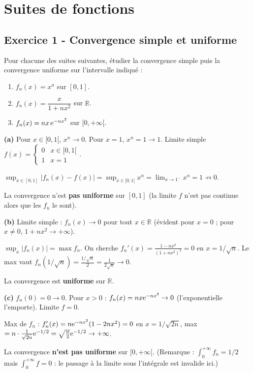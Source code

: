 \documentclass[12pt,a4paper]{article}
\begin{document}
\newpage
\section{Suites de fonctions}

\subsection*{Exercice 1 - Convergence simple et uniforme \niveau{\facile}}

\begin{boiteexercice}
Pour chacune des suites suivantes, étudier la convergence simple puis la convergence uniforme sur l'intervalle indiqué :
\begin{enumerate}[label=(\alph*)]
  \item $f_n(x) = x^n$ sur $[0,1]$.
  \item $f_n(x) = \dfrac{x}{1+nx^2}$ sur $\mathbb{R}$.
  \item $f_n(x) = n x\,\mathrm{e}^{-nx^2}$ sur $[0,+\infty[$.
\end{enumerate}
\end{boiteexercice}

\begin{boitecorrige}
\textbf{(a)} Pour $x\in[0,1[$, $x^n\to0$. Pour $x=1$, $x^n=1\to1$. Limite simple $f(x) = \begin{cases}0 & x\in[0,1[\\1 & x=1\end{cases}$.

$\sup_{x\in[0,1]}|f_n(x)-f(x)| = \sup_{x\in[0,1[}x^n = \lim_{x\to1^-}x^n = 1 \not\to0$.

La convergence n'est \textbf{pas uniforme} sur $[0,1]$ (la limite $f$ n'est pas continue alors que les $f_n$ le sont).

\textbf{(b)} Limite simple : $f_n(x)\to0$ pour tout $x\in\mathbb{R}$ (évident pour $x=0$ ; pour $x\neq0$, $1+nx^2\to+\infty$).

$\sup_{x}|f_n(x)| = \max f_n$. On cherche $f_n'(x)=\frac{1-nx^2}{(1+nx^2)^2}=0$ en $x=1/\sqrt{n}$. Le max vaut $f_n(1/\sqrt{n})=\frac{1/\sqrt{n}}{2}=\frac{1}{2\sqrt{n}}\to0$.

La convergence est \textbf{uniforme} sur $\mathbb{R}$.

\textbf{(c)} $f_n(0)=0\to0$. Pour $x>0$ : $f_n(x)=nx\mathrm{e}^{-nx^2}\to0$ (l'exponentielle l'emporte). Limite $f=0$.

Max de $f_n$ : $f_n'(x)=n\mathrm{e}^{-nx^2}(1-2nx^2)=0$ en $x=1/\sqrt{2n}$, max $= n\cdot\frac{1}{\sqrt{2n}}\mathrm{e}^{-1/2}=\sqrt{\frac{n}{2}}\mathrm{e}^{-1/2}\to+\infty$.

La convergence \textbf{n'est pas uniforme} sur $[0,+\infty[$. (Remarque : $\int_0^{+\infty}f_n=1/2$ mais $\int_0^{+\infty}f=0$ : le passage à la limite sous l'intégrale est invalide ici.)
\end{boitecorrige}
\end{document}
